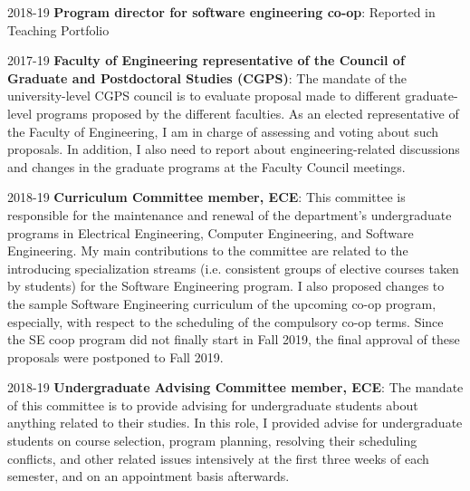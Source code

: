 \begin{yearlist}
\item[2018-19] \textbf{Program director for software engineering co-op}: Reported in Teaching Portfolio
\item[2017-19] \textbf{Faculty of Engineering representative of the Council of Graduate and Postdoctoral Studies (CGPS)}: The mandate of the university-level CGPS council is to evaluate proposal made to different graduate-level programs proposed by the different faculties. As an elected representative of the Faculty of Engineering, I am in charge of assessing and voting about such proposals. In addition, I also need to report about engineering-related discussions and changes in the graduate programs at the Faculty Council meetings. 
\item[2018-19] \textbf{Curriculum Committee member, ECE}: 
This committee is responsible for the maintenance and renewal of the department’s undergraduate programs in Electrical Engineering, Computer Engineering, and Software Engineering. My main contributions to the committee are related to the introducing specialization streams (i.e. consistent groups of elective courses taken by students) for the Software Engineering program. I also proposed changes to the sample Software Engineering curriculum of the upcoming co-op program, especially, with respect to the scheduling of the compulsory co-op terms. Since the SE coop program did not finally start in Fall 2019, the final approval of these proposals were postponed to Fall 2019.

\item[2018-19] \textbf{Undergraduate Advising Committee member, ECE}: 
The mandate of this committee is to provide advising for undergraduate students about anything related to their studies. 
In this role, I provided advise for undergraduate students on course selection, program planning, resolving their scheduling conflicts, and other related issues intensively at the first three weeks of each semester, and on an appointment basis afterwards. 



\end{yearlist}
